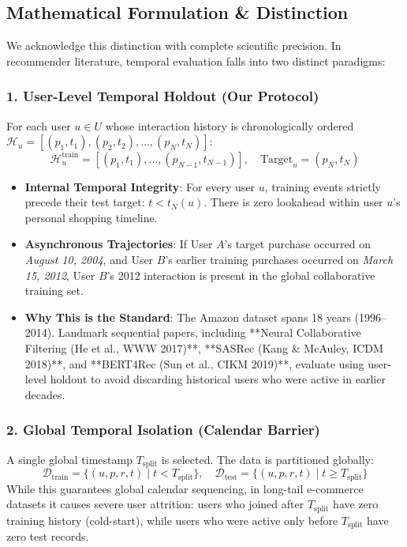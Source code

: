 \documentclass[11pt,a4paper]{article}
\begin{document}
\subsection{Mathematical Formulation \& Distinction}
We acknowledge this distinction with complete scientific precision. In recommender literature, temporal evaluation falls into two distinct paradigms:

\subsubsection{1. User-Level Temporal Holdout (Our Protocol)}
For each user $u \in U$ whose interaction history is chronologically ordered $\mathcal{H}_u = [(p_1, t_1), (p_2, t_2), \dots, (p_N, t_N)]$:
\begin{equation}
    \mathcal{H}_u^{\text{train}} = [(p_1, t_1), \dots, (p_{N-1}, t_{N-1})], \quad \text{Target}_u = (p_N, t_N)
\end{equation}
\begin{itemize}[noitemsep]
    \item \textbf{Internal Temporal Integrity}: For every user $u$, training events strictly precede their test target: $t < t_N(u)$. There is zero lookahead within user $u$'s personal shopping timeline.
    \item \textbf{Asynchronous Trajectories}: If User $A$'s target purchase occurred on \textit{August 10, 2004}, and User $B$'s earlier training purchases occurred on \textit{March 15, 2012}, User $B$'s 2012 interaction is present in the global collaborative training set.
    \item \textbf{Why This is the Standard}: The Amazon dataset spans 18 years (1996--2014). Landmark sequential papers, including **Neural Collaborative Filtering (He et al., WWW 2017)**, **SASRec (Kang \& McAuley, ICDM 2018)**, and **BERT4Rec (Sun et al., CIKM 2019)**, evaluate using user-level holdout to avoid discarding historical users who were active in earlier decades.
\end{itemize}

\subsubsection{2. Global Temporal Isolation (Calendar Barrier)}
A single global timestamp $T_{\text{split}}$ is selected. The data is partitioned globally:
\begin{equation}
    \mathcal{D}_{\text{train}} = \{ (u, p, r, t) \mid t < T_{\text{split}} \}, \quad \mathcal{D}_{\text{test}} = \{ (u, p, r, t) \mid t \ge T_{\text{split}} \}
\end{equation}
While this guarantees global calendar sequencing, in long-tail e-commerce datasets it causes severe user attrition: users who joined after $T_{\text{split}}$ have zero training history (cold-start), while users who were active only before $T_{\text{split}}$ have zero test records.
\end{document}
